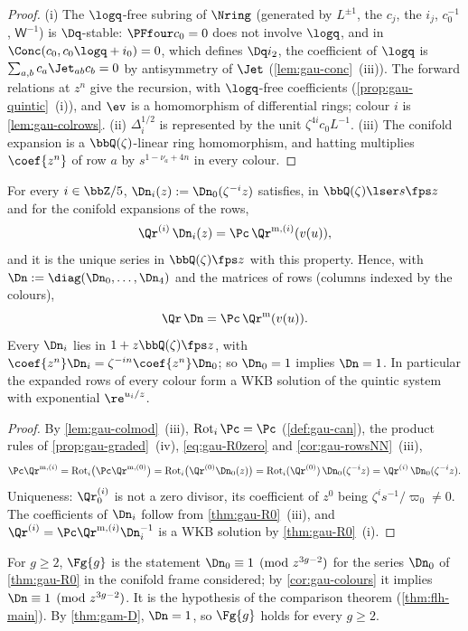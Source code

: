 \begin{proof}
(i) The $\logq$-free subring of $\Nring$ (generated by $L^{\pm1}$, the $c_j$, the $i_j$, $c_0^{-1}$, $\mathsf W^{-1}$) is $\Dq$-stable: $\PFfour c_0=0$ does not involve $\logq$, and in $\Conc(c_0,c_0\logq+i_0)=0$, which defines $\Dq i_2$, the coefficient of $\logq$ is $\sum_{a,b}c_a\Jet_{ab}c_b=0$ by antisymmetry of $\Jet$ (\cref{lem:gau-conc}~(iii)). The forward relations at $z^n$ give the recursion, with $\logq$-free coefficients (\cref{prop:gau-quintic}~(i)), and $\ev$ is a homomorphism of differential rings; colour $i$ is \cref{lem:gau-colrows}. (ii) $\Delta_i^{1/2}$ is represented by the unit $\zeta^{4i}c_0L^{-1}$. (iii) The conifold expansion is a $\bbQ(\zeta)$-linear ring homomorphism, and hatting multiplies $\coef{z^n}$ of row $a$ by $s^{1-\nu_a+4n}$ in every colour.
\end{proof}

\begin{cor}
\label{cor:gau-colours}
For every $i\in\bbZ/5$, $\Dn_i(z):=\Dn_0(\zeta^{-i}z)$ satisfies, in $\bbQ(\zeta)\lser s\fps z$ and for the conifold expansions of the rows,
\[
\Qr^{(i)}\,\Dn_i(z)=\Pc\,\Qr^{\mathrm m,(i)}(v(u)),
\]
and it is the unique series in $\bbQ(\zeta)\fps z$ with this property. Hence, with $\Dn:=\diag(\Dn_0,\dots,\Dn_4)$ and the matrices of rows (columns indexed by the colours),
\begin{equation}
\label{eq:gau-R0}
\Qr\,\Dn=\Pc\,\Qr^{\mathrm m}(v(u)).
\end{equation}
Every $\Dn_i$ lies in $1+z\bbQ(\zeta)\fps z$, with $\coef{z^n}\Dn_i=\zeta^{-in}\coef{z^n}\Dn_0$; so $\Dn_0=1$ implies $\Dn=1$. In particular the expanded rows of every colour form a WKB solution of the quintic system with exponential $\re^{u_i/z}$.
\end{cor}

\begin{proof}
By \cref{lem:gau-colmod}~(iii), $\operatorname{Rot}_i\Pc=\Pc$ (\cref{def:gau-can}), the product rules of \cref{prop:gau-graded}~(iv), \eqref{eq:gau-R0zero} and \cref{cor:gau-rowsNN}~(iii),
\[
\Pc\Qr^{\mathrm m,(i)}=\operatorname{Rot}_i\bigl(\Pc\Qr^{\mathrm m,(0)}\bigr)=\operatorname{Rot}_i\bigl(\Qr^{(0)}\Dn_0(z)\bigr)=\operatorname{Rot}_i(\Qr^{(0)})\,\Dn_0(\zeta^{-i}z)=\Qr^{(i)}\,\Dn_0(\zeta^{-i}z).
\]
Uniqueness: $\Qr^{(i)}_0$ is not a zero divisor, its coefficient of $z^0$ being $\zeta^is^{-1}/\varpi_0\neq0$. The coefficients of $\Dn_i$ follow from \cref{thm:gau-R0}~(iii), and $\Qr^{(i)}=\Pc\Qr^{\mathrm m,(i)}\Dn_i^{-1}$ is a WKB solution by \cref{thm:gau-R0}~(i).
\end{proof}

\begin{defn}
\label{def:gau-Fg}
For $g\geq2$, $\Fg{g}$ is the statement $\Dn_0\equiv1\pmod{z^{3g-2}}$ for the series $\Dn_0$ of \cref{thm:gau-R0} in the conifold frame considered; by \cref{cor:gau-colours} it implies $\Dn\equiv1\pmod{z^{3g-2}}$. It is the hypothesis of the comparison theorem (\cref{thm:flh-main}). By \cref{thm:gam-D}, $\Dn=1$, so $\Fg{g}$ holds for every $g\geq2$.
\end{defn}
